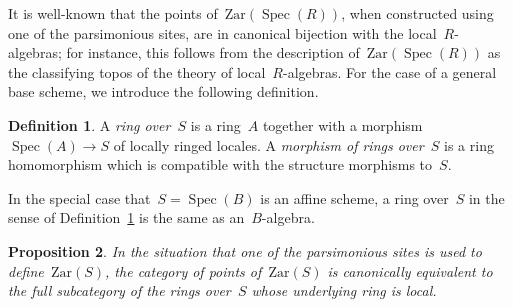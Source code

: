 \documentclass[10pt,reqno,a4paper]{amsbook}
\theoremstyle{definition}
\newtheorem{defn}{Definition}[section]
\theoremstyle{plain}
\newtheorem{prop}[defn]{Proposition}
\theoremstyle{remark}
\newcommand{\Zar}{\mathrm{Zar}}
\DeclareMathOperator{\Spec}{Spec}
\newcommand{\?}{\,{:}\,}
\renewcommand{\_}{\mathpunct{.}\,}
\begin{document}
It is well-known that the points of~$\Zar(\Spec(R))$, when constructed using
one of the parsimonious sites, are in canonical bijection with the
local~$R$-algebras; for instance, this follows from the description
of~$\Zar(\Spec(R))$ as the classifying topos of the theory of
local~$R$-algebras. For the case of a general base scheme, we introduce the
following definition.

\begin{defn}\label{defn:ring-over-s}A \emph{ring over~$S$} is a ring~$A$ together with a
morphism~$\Spec(A) \to S$ of locally ringed locales. A \emph{morphism of rings
over~$S$} is a ring homomorphism which is compatible with the structure
morphisms to~$S$.\end{defn}
%

In the special case that~$S = \Spec(B)$ is an affine scheme, a ring over~$S$ in
the sense of Definition~\ref{defn:ring-over-s} is the same as an~$B$-algebra.

\begin{prop}\label{prop:points-of-big-zariski}
In the situation that one of the parsimonious sites is used to
define~$\Zar(S)$, the category of points of~$\Zar(S)$ is canonically equivalent
to the full subcategory of the rings over~$S$ whose underlying ring is
local.\end{prop}
\end{document}
